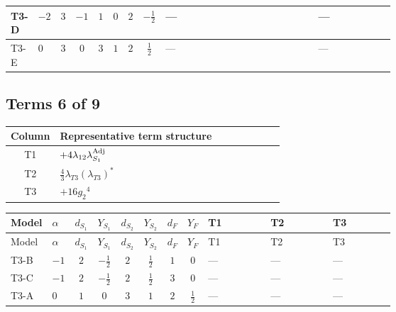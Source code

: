 \documentclass[8pt]{article}
\begin{document}
\begin{landscape}
\begin{longtable}{@{}llcccccc >{\raggedright\arraybackslash}p{0.21\linewidth} >{\raggedright\arraybackslash}p{0.21\linewidth} >{\raggedright\arraybackslash}p{0.21\linewidth}@{}}
\midrule
T3-D & $-2$ & $3$ & $-1$ & $1$ & $0$ & $2$ & $-\frac{1}{2}$ & --- & \scriptsize\adjustbox{max width=\linewidth}{$\begin{gathered} +4 {\lambda_{H1}} {\lambda_{H2}}\end{gathered}$} & --- \\
\midrule
T3-E & $0$ & $3$ & $0$ & $3$ & $1$ & $2$ & $\frac{1}{2}$ & --- & \scriptsize\adjustbox{max width=\linewidth}{$\begin{gathered} +4 {\lambda_{H1}} {\lambda_{H2}}\end{gathered}$} & --- \\
\midrule
\bottomrule
\end{longtable}
\clearpage
\subsection*{Terms 6 of 9}
\begin{center}
\begin{tabular}{@{}c >{\raggedright\arraybackslash}p{0.82\linewidth}@{}}
\toprule
Column & Representative term structure \\
\midrule
T1 & \(\displaystyle +4 {\lambda_{12}} {\lambda_{S_1}^{\rm Adj}}\) \\
\midrule
T2 & \(\displaystyle \frac{4}{3} {\lambda_{T3}} \left({\lambda_{T3}}\right)^{*}\) \\
\midrule
T3 & \(\displaystyle +16 {g_2}^4\) \\
\midrule
\bottomrule
\end{tabular}
\end{center}
\smallskip
\tiny
\begin{longtable}{@{}llcccccc >{\raggedright\arraybackslash}p{0.21\linewidth} >{\raggedright\arraybackslash}p{0.21\linewidth} >{\raggedright\arraybackslash}p{0.21\linewidth}@{}}
\toprule
Model & $\alpha$ & $d_{S_1}$ & $Y_{S_1}$ & $d_{S_2}$ & $Y_{S_2}$ & $d_F$ & $Y_F$ & T1 & T2 & T3 \\
\midrule
\endfirsthead
\toprule
Model & $\alpha$ & $d_{S_1}$ & $Y_{S_1}$ & $d_{S_2}$ & $Y_{S_2}$ & $d_F$ & $Y_F$ & T1 & T2 & T3 \\
\midrule
\endhead
T3-B & $-1$ & $2$ & $-\frac{1}{2}$ & $2$ & $\frac{1}{2}$ & $1$ & $0$ & --- & --- & --- \\
\midrule
T3-C & $-1$ & $2$ & $-\frac{1}{2}$ & $2$ & $\frac{1}{2}$ & $3$ & $0$ & --- & --- & --- \\
\midrule
T3-A & $0$ & $1$ & $0$ & $3$ & $1$ & $2$ & $\frac{1}{2}$ & --- & --- & --- \\

\end{longtable}
\end{landscape}
\end{document}
